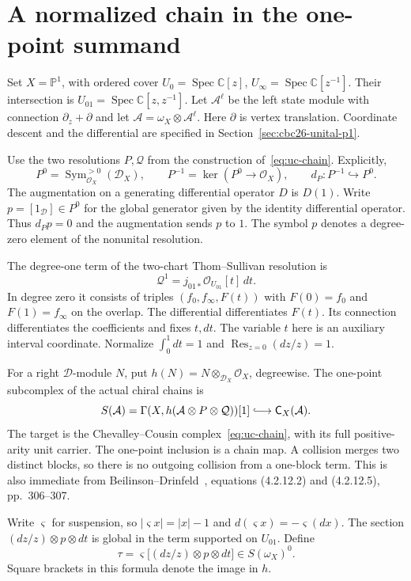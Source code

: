 \section{A normalized chain in the one-point summand}

Set $X=\mathbb P^1$, with ordered cover
$U_0=\operatorname{Spec}\mathbb C[z]$, $U_\infty=\operatorname{Spec}\mathbb C[z^{-1}]$.
Their intersection is $U_{01}=\operatorname{Spec}\mathbb C[z,z^{-1}]$.
Let $\mathcal A^\ell$ be the left state module with connection $\partial_z+\partial$ and let $\mathcal A=\omega_X\otimes\mathcal A^\ell$.
Here $\partial$ is vertex translation.
Coordinate descent and the differential are specified in Section~\ref{sec:cbc26-unital-p1}.

Use the two resolutions $P,\mathcal Q$ from the construction of~\eqref{eq:uc-chain}.
Explicitly,
\[
 P^0=\operatorname{Sym}^{>0}_{\mathcal O_X}(\mathcal D_X),\qquad
 P^{-1}=\ker(P^0\longrightarrow\mathcal O_X),
 \qquad d_P:P^{-1}\hookrightarrow P^0.
\]
The augmentation on a generating differential operator $D$ is $D(1)$.
Write $p=[1_{\mathcal D}]\in P^0$ for the global generator given by the identity differential operator.
Thus $d_Pp=0$ and the augmentation sends $p$ to $1$.
The symbol $p$ denotes a degree-zero element of the nonunital resolution.

The degree-one term of the two-chart Thom--Sullivan resolution is
\[
 \mathcal Q^1=j_{01*}\mathcal O_{U_{01}}[t]\,dt.
\]
In degree zero it consists of triples $(f_0,f_\infty,F(t))$ with $F(0)=f_0$ and $F(1)=f_\infty$ on the overlap.
The differential differentiates $F(t)$.
Its connection differentiates the coefficients and fixes $t,dt$.
The variable $t$ here is an auxiliary interval coordinate.
Normalize $\int_0^1dt=1$ and $\operatorname{Res}_{z=0}(dz/z)=1$.

For a right $\mathcal D$-module $N$, put $h(N)=N\otimes_{\mathcal D_X}\mathcal O_X$, degreewise.
The one-point subcomplex of the actual chiral chains is
\[
 S(\mathcal A)=\Gamma(X,h(\mathcal A\otimes P\otimes\mathcal Q))[1]
 \lhook\joinrel\longrightarrow\mathsf C_X(\mathcal A).
\]
The target is the Chevalley--Cousin complex~\eqref{eq:uc-chain}, with its full positive-arity unit carrier.
The one-point inclusion is a chain map.
A collision merges two distinct blocks, so there is no outgoing collision from a one-block term.
This is also immediate from Beilinson--Drinfeld~\cite{BD026}, equations (4.2.12.2) and (4.2.12.5), pp.~306--307.

Write $\varsigma$ for suspension, so $|\varsigma x|=|x|-1$ and $d(\varsigma x)=-\varsigma(dx)$.
The section $(dz/z)\otimes p\otimes dt$ is global in the term supported on $U_{01}$.
Define
\begin{equation}\label{eq:rp-tau}
 \tau=\varsigma\bigl[(dz/z)\otimes p\otimes dt\bigr]
 \in S(\omega_X)^0.
\end{equation}
Square brackets in this formula denote the image in $h$.

